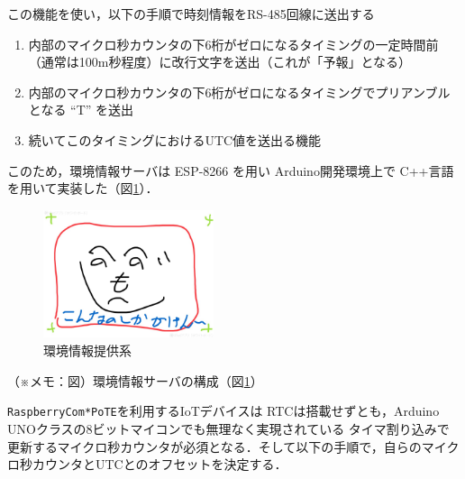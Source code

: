 この機能を使い，以下の手順で時刻情報をRS-485回線に送出する

\begin{enumerate}
\item 内部のマイクロ秒カウンタの下6桁がゼロになるタイミングの一定時間前（通常は100m秒程度）に改行文字を送出（これが「予報」となる）
\item 内部のマイクロ秒カウンタの下6桁がゼロになるタイミングでプリアンブルとなる ``T'' を送出
\item 続いてこのタイミングにおけるUTC値を送出る機能
\end{enumerate}

このため，環境情報サーバは ESP-8266 を用い Arduino開発環境上で C++言語を用いて実装した（図\ref{hohno:RaspberryComPoTE-T}）．

\vspace{-1zh}
\begin{figure}[H]
\centering
\includegraphics[width=5cm]{figspics/henoheno.jpeg}
\caption{環境情報提供系}
\label{hohno:RaspberryComPoTE-T}
\end{figure}
\vspace{-1zh}

（※メモ：図）環境情報サーバの構成（図\ref{hohno:RaspberryComPoTE-T}）


\vspace{0.5zh}
 \par
\vspace{0.5zh}


{\tt Raspberry\-Com*PoTE}を利用するIoTデバイスは RTCは搭載せずとも，Arduino UNOクラスの8ビットマイコンでも無理なく実現されている タイマ割り込みで更新するマイクロ秒カウンタが必須となる．そして以下の手順で，自らのマイクロ秒カウンタとUTCとのオフセットを決定する．

